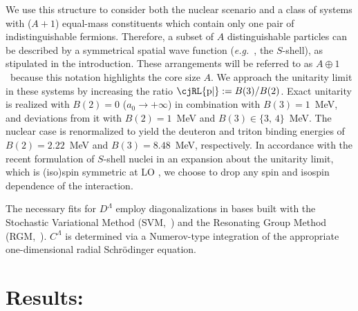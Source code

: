 \documentclass[onecolumn,preprint,superscriptaddress,nofootinbib]{revtex4-1}
\newcommand{\abb}{\mbox{\ensuremath{A\oplus 1}}}
\newcommand{\lec}{C^\Lambda}
\newcommand{\led}{D^\Lambda}
\newcommand{\eg}{\textit{e.g.}~}
\newcommand{\Pe}{\text{\cjRL{p|}}}
\begin{document}
We use this structure to consider both the nuclear scenario and a class of systems with ($A+1$) equal-mass constituents which contain only one pair of indistinguishable fermions. 
Therefore, a subset of $A$ distinguishable particles can be described by a symmetrical spatial wave function (\eg, the $S$-shell), as stipulated in the introduction.
These arrangements will be referred to as \abb~because this notation highlights the core size $A$.
We approach the unitarity limit in these systems by increasing the ratio \mbox{$\Pe:=B(3)/B(2)$}.
Exact unitarity is realized with $B(2)=0$ ($a_0\rightarrow +\infty$) in combination with $B(3)=1$~MeV, and deviations from it with $B(2)=1$~MeV and $B(3)\in\lbrace3,\,4\rbrace$~MeV.
The nuclear case is renormalized to yield the deuteron and triton binding energies of $B(2)=2.22$~MeV and $B(3)=8.48$~MeV, respectively. 
In accordance with the recent formulation of $S$-shell nuclei in an expansion about the unitarity limit, which is (iso)spin symmetric at LO \cite{Konig:2016utl}, we choose to drop any spin and isospin dependence of the interaction.

The necessary fits for $\led$ employ diagonalizations in bases built with the Stochastic
Variational Method (SVM,~\cite{Suzuki:1631377}) and the
Resonating Group Method (RGM,~\cite{PhysRev.52.1083,hmh-rrgm}). $\lec$ is
determined via a Numerov-type integration of the appropriate one-dimensional
radial Schr\"odinger equation.





\newpage
\section*{Results:}
\end{document}
